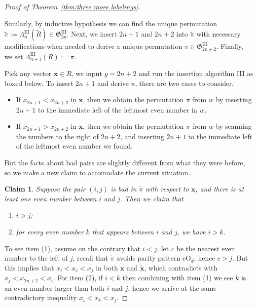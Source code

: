 \documentclass[11pt,reqno]{amsart}
\numberwithin{equation}{section}
\theoremstyle{plain}
\newtheorem{claim}[theorem]{Claim}
\theoremstyle{definition}
\newcommand{\bx}{\mathbf{x}}
\newcommand{\fG}{\mathfrak{G}}
\newcommand{\GIII}{\fG^{\mathrm{III}}}
\newcommand{\LIII}{\Lambda^{\mathrm{III}}}
\def\eO{\mathrm{eO}}
\begin{document}
\begin{proof}[Proof of Theorem~\ref{thm:three more labelings}]
\begin{figure}[h!]
    	
    \end{figure}
    
    Similarly, by inductive hypothesis we can find the unique permutation $\tilde{\pi}:=\LIII_{n}(\tilde{R})\in\GIII_{2n}$. Next, we insert $2n+1$ and $2n+2$ into $\tilde{\pi}$ with necessary modifications when needed to derive a unique permutation $\pi\in\GIII_{2n+2}$. Finally, we set $\LIII_{n+1}(R):=\pi$. 
    
    Pick any vector $\bx\in R$, we input $y=2n+2$ and run the insertion algorithm III as boxed below. To insert $2n+1$ and derive $\pi$, there are two cases to consider. 
    \begin{itemize}
    	\item If $x_{2n+1}<x_{2n+2}$ in $\bx$, then we obtain the permutation $\pi$ from $w$ by inserting $2n+1$ to the immediate left of the leftmost even number in $w$.
    	\item If $x_{2n+1}>x_{2n+2}$ in $\bx$, then we obtain the permutation $\pi$ from $w$ by scanning the numbers to the right of $2n+2$, and inserting $2n+1$ to the immediate left of the leftmost even number we found.
    \end{itemize}
    
    But the facts about bad pairs are slightly different from what they were before, so we make a new claim to accomodate the current situation.
    
    \begin{claim}\label{cla:bad pair III}
    	Suppose the pair $(i,j)$ is bad in $\tilde{\pi}$ with respect to $\bx$, and there is at least one even number between $i$ and $j$. Then we claim that
    	\begin{enumerate}
    		\item $i>j$;
    		\item for every even number $k$ that appears between $i$ and $j$, we have $i>k$.
    	\end{enumerate}
    \end{claim}
    
    To see item (1), assume on the contrary that $i<j$, let $c$ be the nearest even number to the left of $j$, recall that $\tilde{\pi}$ avoids parity pattern $\eO_d$, hence $c>j$. But this implies that $x_i<x_c<x_j$ in both $\bx$ and $\tilde{\bx}$, which contradicts with $x_j<x_{2n+2}<x_i$. For item (2), if $i<k$ then combining with item (1) we see $k$ is an even number larger than both $i$ and $j$, hence we arrive at the same contradictory inequality $x_i<x_k<x_j$. 
    

\end{proof}
\end{document}
